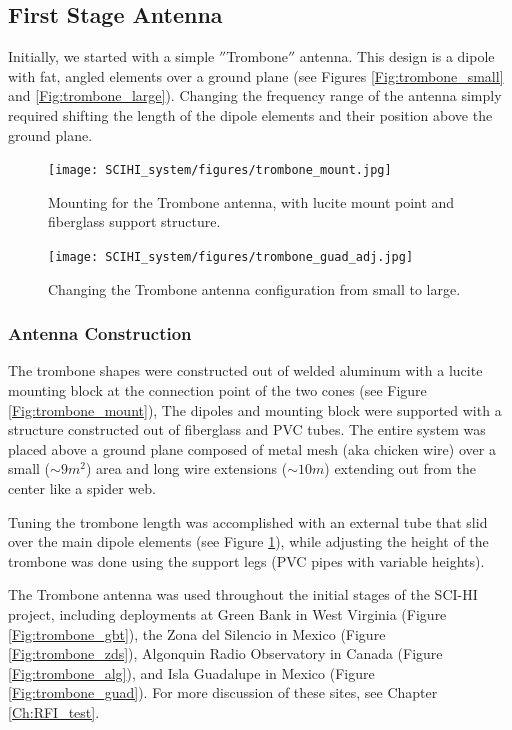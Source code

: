 \subsection{First Stage Antenna}
Initially, we started with a simple $''$Trombone$''$ antenna. This design is a dipole with fat, angled elements over a ground plane (see Figures \ref{Fig:trombone_small} and \ref{Fig:trombone_large}). Changing the frequency range of the antenna simply required shifting the length of the dipole elements and their position above the ground plane. 

\begin{figure}[htb]
\centering
\begin{minipage}[b]{0.53\textwidth}
\centering
\texttt{[image: SCIHI\_system/figures/trombone\_mount.jpg]}
\caption{Mounting for the Trombone antenna, with lucite mount point and fiberglass support structure. }
\label{Fig:trombone_mount}
\end{minipage}%
\begin{minipage}[b]{0.02\textwidth}
\hspace{1cm}
\end{minipage}%
\begin{minipage}[b]{0.41\textwidth}
\centering
\texttt{[image: SCIHI\_system/figures/trombone\_guad\_adj.jpg]}
\caption{Changing the Trombone antenna configuration from small to large.}
\label{Fig:trombone_adj}
\end{minipage}
\end{figure}

\subsubsection{Antenna Construction}
The trombone shapes were constructed out of welded aluminum with a lucite mounting block at the connection point of the two cones (see Figure \ref{Fig:trombone_mount}), The dipoles and mounting block were supported with a structure constructed out of fiberglass and PVC tubes. The entire system was placed above a ground plane composed of metal mesh (aka chicken wire) over a small ($\sim9 m^2$) area and long wire extensions ($\sim10 m$) extending out from the center like a spider web. 

Tuning the trombone length was accomplished with an external tube that slid over the main dipole elements (see Figure \ref{Fig:trombone_adj}), while adjusting the height of the trombone was done using the support legs (PVC pipes with variable heights).

The Trombone antenna was used throughout the initial stages of the SCI-HI project, including deployments at Green Bank in West Virginia (Figure \ref{Fig:trombone_gbt}), the Zona del Silencio in Mexico (Figure \ref{Fig:trombone_zds}), Algonquin Radio Observatory in Canada (Figure \ref{Fig:trombone_alg}), and Isla Guadalupe in Mexico (Figure \ref{Fig:trombone_guad}). For more discussion of these sites, see Chapter \ref{Ch:RFI_test}.

